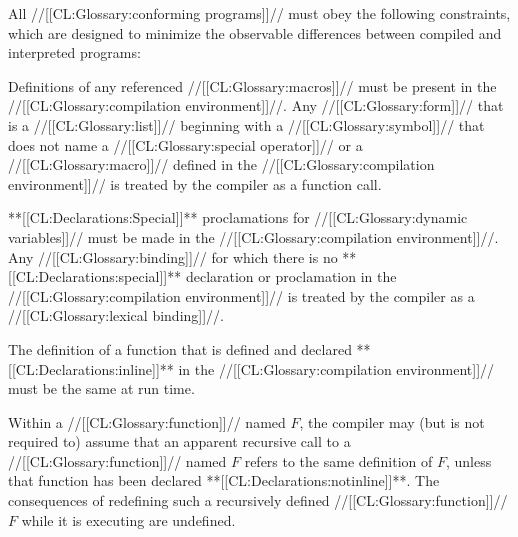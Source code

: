 
















All //[[CL:Glossary:conforming programs]]// must obey the following constraints,
which are designed to minimize the observable differences 
between compiled and interpreted programs:

\beginlist















 \itemitem{\bull} Definitions of any referenced //[[CL:Glossary:macros]]//
must be present in the //[[CL:Glossary:compilation environment]]//.  
Any //[[CL:Glossary:form]]// that is a //[[CL:Glossary:list]]//
beginning with a //[[CL:Glossary:symbol]]// that does not name a
//[[CL:Glossary:special operator]]// or a //[[CL:Glossary:macro]]// defined in the 
//[[CL:Glossary:compilation environment]]// is treated by the compiler as a 
function call.




 \itemitem{\bull} **[[CL:Declarations:Special]]** proclamations for //[[CL:Glossary:dynamic variables]]//
must be made in the //[[CL:Glossary:compilation environment]]//.  Any //[[CL:Glossary:binding]]//
for which there is no **[[CL:Declarations:special]]** declaration or proclamation in
the //[[CL:Glossary:compilation environment]]// is treated by the compiler as
a //[[CL:Glossary:lexical binding]]//.



 \itemitem{\bull} The definition of a function that is defined and
declared **[[CL:Declarations:inline]]** in the //[[CL:Glossary:compilation environment]]// must be
the same at run time.
 




  
 \itemitem{\bull} Within a //[[CL:Glossary:function]]// named $F$, the compiler may
(but is not required to)
assume that an apparent recursive call to a //[[CL:Glossary:function]]// named $F$ 
refers to the same definition of $F$,
unless that function has been declared **[[CL:Declarations:notinline]]**.
The consequences of redefining such a recursively defined //[[CL:Glossary:function]]// $F$ 
while it is executing are undefined.

